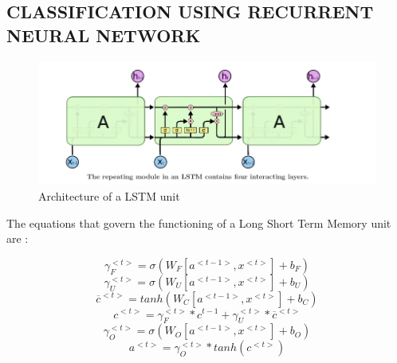 \documentclass[a4paper,11pt]{article}
\begin{document}
\subsection{CLASSIFICATION USING RECURRENT NEURAL NETWORK}
\begin{figure}[ht]
    \centering
    \includegraphics[width=\linewidth]{x.png}
    \caption{Architecture of a LSTM unit}
    \label{fig:my_label}
\end{figure}


The equations that govern the functioning of a Long Short Term Memory unit are :

 \begin{equation}
     \gamma_F^{<t>} = \sigma(W_F  [a^{<t-1>}, x^{<t>}] + b_F)
 \end{equation}
 \begin{equation}
     \gamma_U^{<t>} = \sigma(W_U  [a^{<t-1>}, x^{<t>}] + b_U)
 \end{equation}
 \begin{equation}
     \overline{c}^{<t>} = tanh(W_C[a^{<t-1>}, x^{<t>}] + b_C)
 \end{equation}
 \begin{equation}
     c^{<t>} = \gamma_F^{<t>} * c^{t-1} + \gamma_U^{<t>} * \overline{c}^{<t>}
 \end{equation}
 \begin{equation}
     \gamma_O^{<t>} = \sigma(W_O  [a^{<t-1>}, x^{<t>}] + b_O)
 \end{equation}
 \begin{equation}
    a^{<t>} = \gamma_O^{<t>} * tanh(c^{<t>})
 \end{equation}
 
\end{document}
